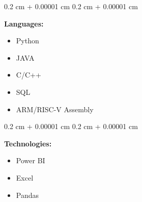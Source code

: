\documentclass[10pt, letterpaper]{article}
\newenvironment{highlights}{
    \begin{itemize}[
        topsep=0.10 cm,
        parsep=0.10 cm,
        partopsep=0pt,
        itemsep=0pt,
        leftmargin=0.4 cm + 10pt
    ]
}{
    \end{itemize}
} %
\newenvironment{onecolentry}{
    \begin{adjustwidth}{
        0.2 cm + 0.00001 cm
    }{
        0.2 cm + 0.00001 cm
    }
}{
    \end{adjustwidth}
} %
\begin{document}
        
        \begin{onecolentry}
            \textbf{Languages:}
            \begin{highlights}
                \item Python
                \item JAVA
                \item C/C++
                \item SQL
                \item ARM/RISC-V Assembly
            \end{highlights}
        \end{onecolentry}

        \vspace{0.2 cm}

        \begin{onecolentry}
            \textbf{Technologies:}
            \begin{highlights}
                \item Power BI
                \item Excel
                \item Pandas
            \end{highlights}
        \end{onecolentry}
\end{document}
